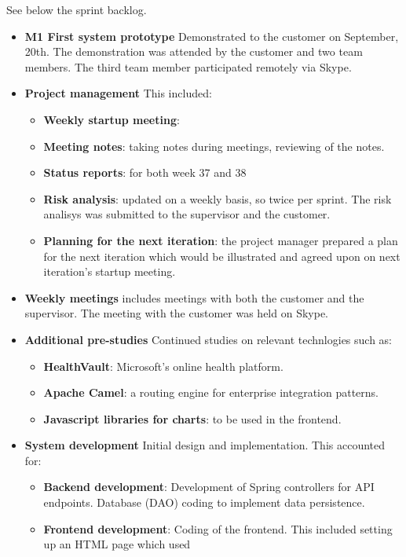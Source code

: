 See below the sprint backlog.
\begin{itemize}
	\item \textbf{M1 First system prototype}
		Demonstrated to the customer on September, 20th.
		The demonstration was attended by the customer and two team members.
		The third team member participated remotely via Skype.
	\item \textbf{Project management}\newline
		This included:
		\begin{itemize}
			\item \textbf{Weekly startup meeting}: 
			\item \textbf{Meeting notes}:
				taking notes during meetings, reviewing of the notes.
			\item \textbf{Status reports}:
				for both week 37 and 38
			\item \textbf{Risk analysis}:
				updated on a weekly basis, so twice per sprint.
				The risk analisys was submitted to the supervisor and the customer.
			\item \textbf{Planning for the next iteration}:
				the project manager prepared a plan for the next iteration
				which would be illustrated and agreed upon on next iteration's startup meeting.
		\end{itemize}
	\item \textbf{Weekly meetings}
		includes meetings with both the customer and the supervisor.
		The meeting with the customer was held on Skype.
	\item \textbf{Additional pre-studies}
		Continued studies on relevant technlogies such as:
	\begin{itemize}
		\item \textbf{HealthVault}: Microsoft's online health platform.
		\item \textbf{Apache Camel}: a routing engine for enterprise integration patterns.
		\item \textbf{Javascript libraries for charts}: to be used in the frontend.
	\end{itemize}
	\item \textbf{System development}
		Initial design and implementation. This accounted for:
	\begin{itemize}
		\item \textbf{Backend development}:
			Development of Spring controllers for API endpoints. Database (DAO) coding to
			implement data persistence.
		\item \textbf{Frontend development}:
			Coding of the frontend. This included setting up an HTML page which used

\end{itemize}
\end{itemize}
